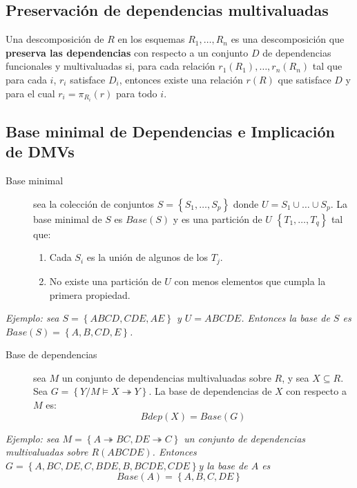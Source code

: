 \documentclass[a4paper, twoside]{article}
\begin{document}
\subsection{Preservación de dependencias multivaluadas}
Una descomposición de $R$ en los esquemas $R_{1}, \ldots, R_{n}$ es una descomposición que \textbf{preserva las dependencias} con respecto a un conjunto $D$ de dependencias funcionales y multivaluadas si, para cada relación $r_{1}(R_{1}), \ldots, r_{n}(R_{n})$ tal que para cada $i$, $r_{i}$ satisface $D_{i}$, entonces existe una relación
$r(R)$ que satisface $D$ y para el cual $r_{i} = \pi_{R_{i}}(r)$ para todo $i$.

\subsection{Base minimal de Dependencias e Implicación de DMVs}
\begin{description}
	\item[Base minimal] sea la colección de conjuntos $S = \left\{ S_{1}, \ldots, S_{p} \right\}$ donde $U = S_{1} \cup \ldots \cup S_{p}$. La base minimal de $S$ es $Base(S)$ y es una partición de $U$ $\left\{ T_{1}, \ldots, T_{q}\right\}$ tal que:
	\begin{enumerate}
		\item Cada $S_{i}$ es la unión de algunos de los $T_{j}$.
		\item No existe una partición de $U$ con menos elementos que cumpla la primera propiedad.
	\end{enumerate}
\end{description}

\emph{Ejemplo: sea $S=\left\{ ABCD,CDE,AE\right\} $ y $U=ABCDE$. Entonces la base de $S$ es $Base(S)=\left\{ A,B,CD,E\right\}$.}

\begin{description}
	\item[Base de dependencias] sea $M$ un conjunto de dependencias multivaluadas sobre $R$, y sea $X \subseteq R$. Sea $G = \left\{ Y/M \models X \twoheadrightarrow Y \right\}$. La base de dependencias de $X$ con respecto a $M$ es:
	\[
		Bdep(X)=Base\left(G\right)
	\]
\end{description}

\emph{Ejemplo: sea $M=\left\{ A\twoheadrightarrow BC,DE\twoheadrightarrow C\right\}$ un conjunto de dependencias multivaluadas sobre $R(ABCDE)$. Entonces $G=\left\{ A,BC,DE,C,BDE,B,BCDE,CDE\right\} $y la base de $A$ es}
\[
	Base(A)=\left\{ A,B,C,DE\right\} 
\]
\end{document}
